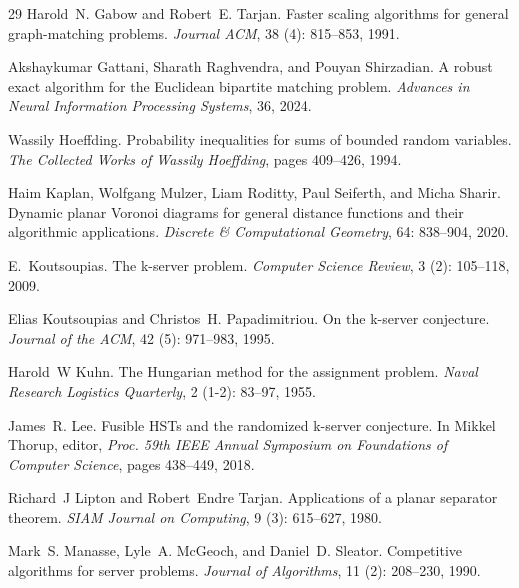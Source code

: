 \documentclass[11pt,onecolumn]{article}
\begin{document}
\begin{thebibliography}{29}
Harold~N. Gabow and Robert~E. Tarjan.
\newblock Faster scaling algorithms for general graph-matching problems.
\newblock \emph{Journal ACM}, 38 (4): 815--853, 1991.

Akshaykumar Gattani, Sharath Raghvendra, and Pouyan Shirzadian.
\newblock A robust exact algorithm for the {E}uclidean bipartite matching problem.
\newblock \emph{Advances in Neural Information Processing Systems}, 36, 2024.

Wassily Hoeffding.
\newblock Probability inequalities for sums of bounded random variables.
\newblock \emph{The Collected Works of Wassily Hoeffding}, pages 409--426, 1994.

Haim Kaplan, Wolfgang Mulzer, Liam Roditty, Paul Seiferth, and Micha Sharir.
\newblock Dynamic planar {V}oronoi diagrams for general distance functions and their algorithmic applications.
\newblock \emph{Discrete \& Computational Geometry}, 64: 838--904, 2020.

E.~Koutsoupias.
\newblock The k-server problem.
\newblock \emph{Computer Science Review}, 3 (2): 105--118, 2009.

Elias Koutsoupias and Christos~H. Papadimitriou.
\newblock On the k-server conjecture.
\newblock \emph{Journal of the ACM}, 42 (5): 971--983, 1995.

Harold~W Kuhn.
\newblock The {Hungarian} method for the assignment problem.
\newblock \emph{Naval Research Logistics Quarterly}, 2 (1-2): 83--97, 1955.

James~R. Lee.
\newblock Fusible {HST}s and the randomized k-server conjecture.
\newblock In Mikkel Thorup, editor, \emph{Proc. 59th {IEEE} Annual Symposium on Foundations of Computer Science}, pages 438--449, 2018.

Richard~J Lipton and Robert~Endre Tarjan.
\newblock Applications of a planar separator theorem.
\newblock \emph{SIAM Journal on Computing}, 9 (3): 615--627, 1980.

Mark~S. Manasse, Lyle~A. McGeoch, and Daniel~D. Sleator.
\newblock Competitive algorithms for server problems.
\newblock \emph{Journal of Algorithms}, 11 (2): 208--230, 1990.


\end{thebibliography}
\end{document}
